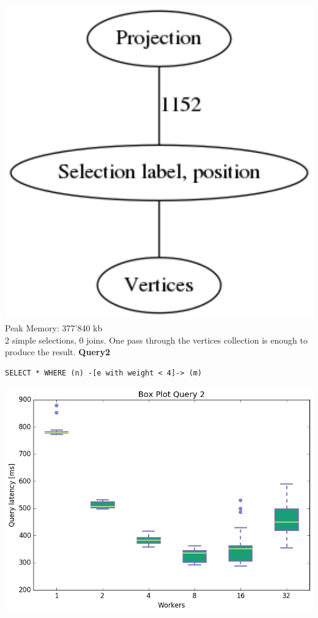 \documentclass[11pt,singlecolumn]{scrartcl}
\begin{document}
\includegraphics[width=1\textwidth]{graph1}
Peak Memory: 377'840 kb \\
2 simple selections, 0 joins. One pass through the vertices collection is enough to produce the result.
\clearpage
\textbf{Query2}\\
\begin{verbatim}
SELECT * WHERE (n) -[e with weight < 4]-> (m)\end{verbatim}
\includegraphics[width=1\textwidth]{box/q2}
\end{document}
